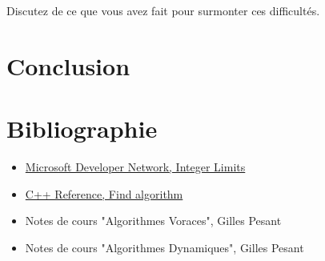 \documentclass[10pt,a4paper]{article}
\begin{document}
    Discutez de ce que vous avez fait pour surmonter ces difficultés.

\fg

\section{Conclusion}

\section{Bibliographie}

\begin{itemize}
	\item \href{http://msdn.microsoft.com/en-us/library/296az74e.aspx}{Microsoft Developer Network, Integer Limits}
	\item \href{http://www.cplusplus.com/reference/algorithm/find/}{C++ Reference, Find algorithm}
	\item Notes de cours "Algorithmes Voraces", Gilles Pesant
	\item Notes de cours "Algorithmes Dynamiques", Gilles Pesant
\end{itemize}
\end{document}
